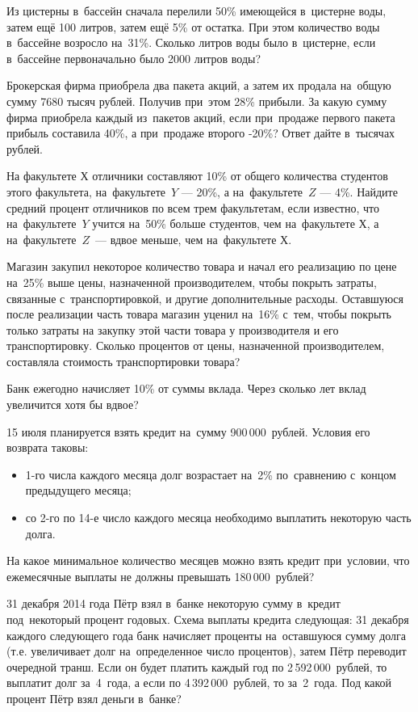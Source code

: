 %
Из цистерны в~бассейн сначала перелили 50\% имеющейся в~цистерне воды, затем ещё 100 литров, затем ещё 5\% от остатка. 
При этом количество воды в~бассейне возросло на~31\%. 
Сколько литров воды было в~цистерне, если в~бассейне первоначально было 2000 литров воды?

%
Брокерская фирма приобрела два пакета акций, а затем их продала на~общую сумму 7680 тысяч рублей. Получив при~этом 28\% прибыли. 
За какую сумму фирма приобрела каждый из~пакетов акций, если при~продаже первого пакета прибыль составила 40\%, а при~продаже второго -20\%? 
Ответ дайте в~тысячах рублей.

%
На факультете Х отличники составляют 10\% от общего количества студентов этого факультета, на~факультете~$Y$ — 20\%, а на~факультете~$Z$ — 4\%. 
Найдите средний процент отличников по всем трем факультетам, если известно, что на~факультете~$Y$ учится на~50\% больше студентов, 
чем на~факультете Х, а на~факультете~$Z$~— вдвое меньше, чем на~факультете Х.

%
Магазин закупил некоторое количество товара и начал его реализацию по цене на~25\% выше цены, назначенной производителем, 
чтобы покрыть затраты, связанные с~транспортировкой, и другие дополнительные расходы. 
Оставшуюся после реализации часть товара магазин уценил на~16\% с~тем, чтобы покрыть только затраты 
на закупку этой части товара у производителя и его транспортировку. 
Сколько процентов от цены, назначенной производителем, составляла стоимость транспортировки товара?

%
Банк ежегодно начисляет 10\% от суммы вклада. Через сколько лет вклад увеличится хотя бы вдвое?

%
15 июля планируется взять кредит на~сумму 900\,000~рублей. Условия его возврата таковы: 
\begin{itemize}
    \item 1-го числа каждого месяца долг возрастает на~2\% по~сравнению с~концом предыдущего месяца;
    \item со 2-го по 14-е число каждого месяца необходимо выплатить некоторую часть долга.
\end{itemize}
На какое минимальное количество месяцев можно взять кредит при~условии, что ежемесячные выплаты не должны превышать 180\,000~рублей? 

%
31 декабря 2014 года Пётр взял в~банке некоторую сумму в~кредит под~некоторый процент годовых. 
Схема выплаты кредита следующая: 31 декабря каждого следующего года банк начисляет проценты на~оставшуюся сумму долга 
(т.е. увеличивает долг на~определенное число процентов), затем Пётр переводит очередной транш. 
Если он будет платить каждый год по 2\,592\,000~рублей, то выплатит долг за~4~года, а если по 4\,392\,000~рублей, то за~2~года. 
Под какой процент Пётр взял деньги в~банке?

